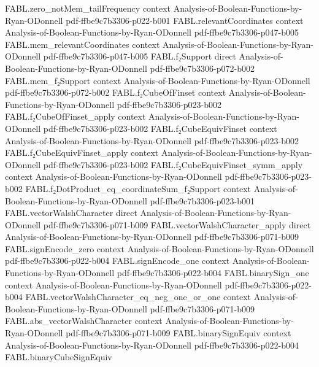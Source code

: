\begin{theorem}
\proofstep
  {FABL.zero_notMem_tailFrequency}
  {context}
  {Analysis-of-Boolean-Functions-by-Ryan-ODonnell}
  {pdf-ffbe9c7b3306-p022-b001}
\proofstep
  {FABL.relevantCoordinates}
  {context}
  {Analysis-of-Boolean-Functions-by-Ryan-ODonnell}
  {pdf-ffbe9c7b3306-p047-b005}
\proofstep
  {FABL.mem_relevantCoordinates}
  {context}
  {Analysis-of-Boolean-Functions-by-Ryan-ODonnell}
  {pdf-ffbe9c7b3306-p047-b005}
\proofstep
  {FABL.f₂Support}
  {direct}
  {Analysis-of-Boolean-Functions-by-Ryan-ODonnell}
  {pdf-ffbe9c7b3306-p072-b002}
\proofstep
  {FABL.mem_f₂Support}
  {context}
  {Analysis-of-Boolean-Functions-by-Ryan-ODonnell}
  {pdf-ffbe9c7b3306-p072-b002}
\proofstep
  {FABL.f₂CubeOfFinset}
  {context}
  {Analysis-of-Boolean-Functions-by-Ryan-ODonnell}
  {pdf-ffbe9c7b3306-p023-b002}
\proofstep
  {FABL.f₂CubeOfFinset_apply}
  {context}
  {Analysis-of-Boolean-Functions-by-Ryan-ODonnell}
  {pdf-ffbe9c7b3306-p023-b002}
\proofstep
  {FABL.f₂CubeEquivFinset}
  {context}
  {Analysis-of-Boolean-Functions-by-Ryan-ODonnell}
  {pdf-ffbe9c7b3306-p023-b002}
\proofstep
  {FABL.f₂CubeEquivFinset_apply}
  {context}
  {Analysis-of-Boolean-Functions-by-Ryan-ODonnell}
  {pdf-ffbe9c7b3306-p023-b002}
\proofstep
  {FABL.f₂CubeEquivFinset_symm_apply}
  {context}
  {Analysis-of-Boolean-Functions-by-Ryan-ODonnell}
  {pdf-ffbe9c7b3306-p023-b002}
\proofstep
  {FABL.f₂DotProduct_eq_coordinateSum_f₂Support}
  {context}
  {Analysis-of-Boolean-Functions-by-Ryan-ODonnell}
  {pdf-ffbe9c7b3306-p023-b001}
\proofstep
  {FABL.vectorWalshCharacter}
  {direct}
  {Analysis-of-Boolean-Functions-by-Ryan-ODonnell}
  {pdf-ffbe9c7b3306-p071-b009}
\proofstep
  {FABL.vectorWalshCharacter_apply}
  {direct}
  {Analysis-of-Boolean-Functions-by-Ryan-ODonnell}
  {pdf-ffbe9c7b3306-p071-b009}
\proofstep
  {FABL.signEncode_zero}
  {context}
  {Analysis-of-Boolean-Functions-by-Ryan-ODonnell}
  {pdf-ffbe9c7b3306-p022-b004}
\proofstep
  {FABL.signEncode_one}
  {context}
  {Analysis-of-Boolean-Functions-by-Ryan-ODonnell}
  {pdf-ffbe9c7b3306-p022-b004}
\proofstep
  {FABL.binarySign_one}
  {context}
  {Analysis-of-Boolean-Functions-by-Ryan-ODonnell}
  {pdf-ffbe9c7b3306-p022-b004}
\proofstep
  {FABL.vectorWalshCharacter_eq_neg_one_or_one}
  {context}
  {Analysis-of-Boolean-Functions-by-Ryan-ODonnell}
  {pdf-ffbe9c7b3306-p071-b009}
\proofstep
  {FABL.abs_vectorWalshCharacter}
  {context}
  {Analysis-of-Boolean-Functions-by-Ryan-ODonnell}
  {pdf-ffbe9c7b3306-p071-b009}
\proofstep
  {FABL.binarySignEquiv}
  {context}
  {Analysis-of-Boolean-Functions-by-Ryan-ODonnell}
  {pdf-ffbe9c7b3306-p022-b004}
\proofstep
  {FABL.binaryCubeSignEquiv}

\end{theorem}
